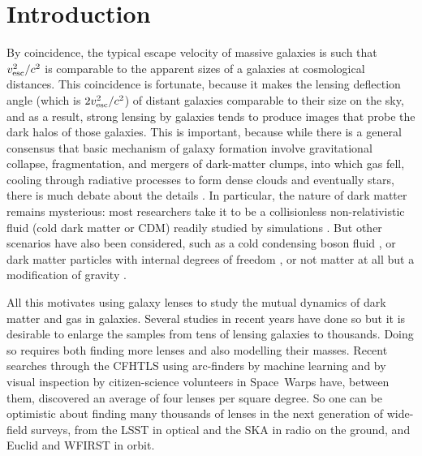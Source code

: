 \section{Introduction}

By coincidence, the typical escape velocity of massive galaxies is
such that $v_{\rm esc}^2/c^2$ is comparable to the apparent sizes of a
galaxies at cosmological distances.  This coincidence is fortunate,
because it makes the lensing deflection angle (which is $2v_{\rm
  esc}^2/c^2$) of distant galaxies comparable to their size on the
sky, and as a result, strong lensing by galaxies tends to produce
images that probe the dark halos of those galaxies.  This is
important, because while there is a general consensus that basic
mechanism of galaxy formation involve gravitational collapse,
fragmentation, and mergers of dark-matter clumps, into which gas fell,
cooling through radiative processes to form dense clouds and
eventually stars, there is much debate about the details \citep[for a
  summary, see][]{2012RAA....12..917S}.  In particular, the nature of
dark matter remains mysterious: most researchers take it to be a
collisionless non-relativistic fluid (cold dark matter or CDM) readily
studied by simulations \citep[for example, the millenium simulation
  by][which has been particularly influential]{2005Natur.435..629S}.
But other scenarios have also been considered, such as a cold
condensing boson fluid \citep{2016ApJ...818...89S}, or dark matter
particles with internal degrees of freedom
\citep{2010MNRAS.405...77S}, or not matter at all but a modification
of gravity \citep{2016PhRvL.117t1101M}.

All this motivates using galaxy lenses to study the mutual dynamics of
dark matter and gas in galaxies.  Several studies in recent years have
done so
\citep{2009ApJ...703L..51K,2011ApJ...740...97L,2012MNRAS.424..104L,
  2016MNRAS.459.3677L,2016MNRAS.456..870B} but it is desirable to
enlarge the samples from tens of lensing galaxies to thousands.  Doing
so requires both finding more lenses and also modelling their masses.
Recent searches through the CFHTLS \citep{2012SPIE.8448E..0MC} using
arc-finders
\citep{2012ApJ...749...38M,2014A&A...567A.111M,2014ApJ...785..144G} by
machine learning \citep{2016A&A...592A..75P} and by visual inspection
by citizen-science volunteers in Space~Warps
\citep{2016MNRAS.455.1191M} have, between them, discovered an average
of four lenses per square degree.  So one can be optimistic about
finding many thousands of lenses in the next generation of wide-field
surveys, from the LSST in optical and the SKA in radio on the ground,
and Euclid and WFIRST in orbit.

